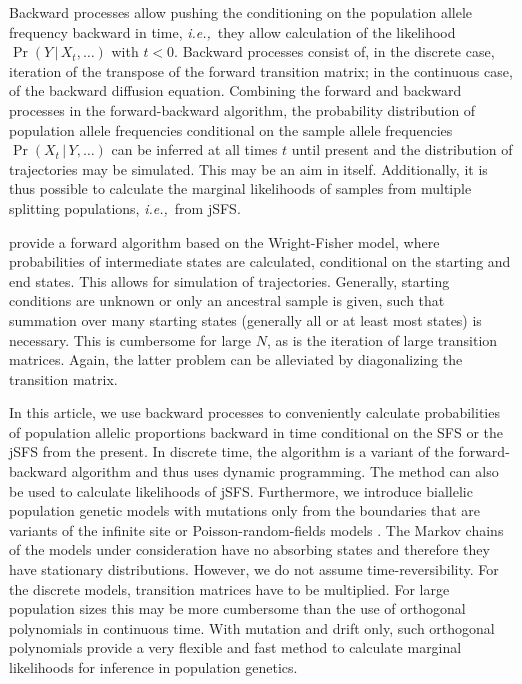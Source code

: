 \documentclass[preprint]{elsarticle}
\newcommand\given{{\,|\,}}
\newcommand\ie{{\it i.e.,}}
\begin{document}
Backward processes allow pushing the conditioning on the population allele frequency backward in time, \ie\ they allow calculation of the likelihood $\Pr(Y\given X_t, \dots)$ with $t<0$. Backward processes consist of, in the discrete case, iteration of the transpose of the forward transition matrix; in the continuous case, of the backward diffusion equation. Combining the forward and backward processes in the forward-backward algorithm, the probability distribution of population allele frequencies conditional on the sample allele frequencies $\Pr(X_t\given Y,\dots)$ can be inferred at all times $t$ until present and the distribution of trajectories may be simulated. This may be an aim in itself. Additionally, it is thus possible to calculate the marginal likelihoods of samples from multiple splitting populations, \ie\ from jSFS.

\citet{Zhao13} provide a forward algorithm based on the Wright-Fisher model, where probabilities of intermediate states are calculated, conditional on the starting and end states. This allows for simulation of trajectories. Generally, starting conditions are unknown or only an ancestral sample is given, such that summation over many starting states (generally all or at least most states) is necessary. This is cumbersome for large $N$, as is the iteration of large transition matrices. Again, the latter problem can be alleviated by diagonalizing the transition matrix. 

In this article, we use backward processes to conveniently calculate probabilities of population allelic proportions backward in time conditional on the SFS or the jSFS from the present. In discrete time, the algorithm is a variant of the forward-backward algorithm and thus uses dynamic programming. The method can also be used to calculate likelihoods of jSFS. Furthermore, we introduce biallelic population genetic models with mutations only from the boundaries that are variants of the infinite site or Poisson-random-fields models \citep{Kimu69,Sawy92}. The Markov chains of the models under consideration have no absorbing states and therefore they have stationary distributions.  However, we do not assume time-reversibility. For the discrete models, transition matrices have to be multiplied. For large population sizes this may be more cumbersome than the use of orthogonal polynomials in continuous time. With mutation and drift only, such orthogonal polynomials provide a very flexible and fast method to calculate marginal likelihoods for inference in population genetics.
\end{document}
